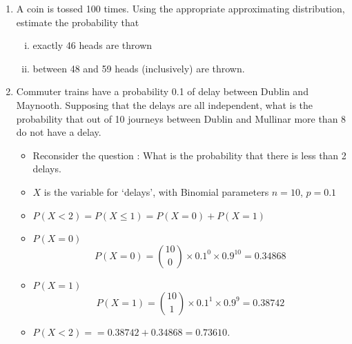 \documentclass[a4paper,12pt]{article}
\begin{document}
\begin{enumerate}
\item A coin is tossed 100 times. Using the appropriate approximating distribution, estimate the probability that
\begin{enumerate}[(i)]
\item exactly 46 heads are thrown
\item  between 48 and 59 heads (inclusively) are thrown.
\end{enumerate}

\item Commuter trains have a probability 0.1 of delay
between Dublin and Maynooth. Supposing that the delays are all independent,
what is the probability that out of 10 journeys between Dublin and
Mullinar more than 8 do not have a delay.
\begin{itemize}
\item Reconsider the question : What is the probability that there is less than 2 delays.
\item $X$ is the variable for `delays', with Binomial parameters $n=10$, $p=0.1$
\item $P(X < 2) = P(X \leq 1) = P(X=0)+P(X=1)$
\item $P(X=0)$
\[P(X=0)= {10 \choose 0} \times 0.1^0  \times 0.9^10 = 0.34868\]
\item $P(X=1)$
\[P(X=1)= {10 \choose 1} \times 0.1^1  \times 0.9^9 = 0.38742\]
\item $P(X < 2) = = 0.38742 + 0.34868 = 0.73610.$
\end{itemize}



\end{enumerate}
\end{document}
